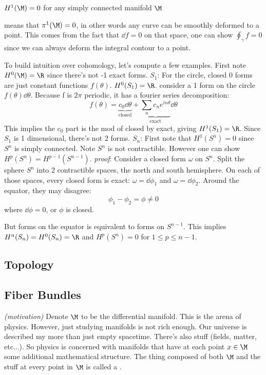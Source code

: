 \documentclass[11pt]{scrartcl}
\begin{document}
\begin{theorem}
	$H^1(\M) = 0$ for any simply connected manifold $\M$
	\end{theorem}
 means that $\pi^1(\M) = 0$, in other words any curve can be smoothly deformed to a point.   This comes from the fact that $\dd f = 0$ on that space, one can show $\oint_\gamma f = 0$ since we can always deform the integral contour to a point.

\begin{example}
	To build intuition over cohomology, let's compute a few examples.
	First note $H^0 (\M) = \R$ since there's not -1 exact forms.
	\newline
	\emph{$S_1$}:
	For the circle, closed 0 forms are just constant functions $f(\theta)$.
	$H^0 (S_1) = \R$.
	consider a 1 form on the circle $f(\theta) \dd \theta$.
	Because f is $ 2 \pi$ periodic, it has a fourier series decomposition:
	\[f(\theta) = \underbrace{c_0 \dd \theta}_{\text{closed}} + \underbrace{\sum_n c_n e^{in\theta}}_{\text{exact}}  \dd \theta \]
	This implies the $c_0$ part is the mod of closed by exact, giving $H^1(S_1) = \R$.
	Since $S_1$ is 1 dimensional, there's not 2 forms.
	\newline
	\emph{$S_n$}:
	First note that $H^1(S^n) = 0$ since $S^n$ is simply connected.
	Note $S^n$ is not contractible.  However one can show $H^p(S^n) = H^{p-1} (S^{n-1})$.  
	\emph{proof}: Consider a  closed form $\omega$ on $S^n$.
	Split the sphere $S^n$ into 2 contractible spaces, the north and south hemisphere.  On each of those spaces, every closed form is exact:
	$\omega = \dd \phi_1$ and $\omega = \dd \phi_2$.  Around the equator, they may disagree:
	\[ \phi_1 -  \phi_2 =  \phi \neq 0 \]
	where $\dd \phi = 0$, or $\phi$ is closed.
	
	But forms on the  equator is equivalent to forms on $S^{n-1}$.
	This implies $H^n(S_n) = H^0(S_n) = \R$ and $H^p(S^n) = 0$ for $1 \leq p \leq n-1$.
	\end{example}

\subsection{Topology}

\subsection{Fiber Bundles}


\emph{(motivation)}
Denote $\M$ to be the differential manifold.  This is the arena of physics.  However, just studying manifolds is not rich enough.  Our universe is described my more than just empty spacetime.  There's also stuff (fields, matter, etc...).  So physics is concerned with manifolds that have at each point $x \in \M$ some additional mathematical structure. The thing composed of both $\M$ and the stuff at every point in $\M$ is called a .
\end{document}
